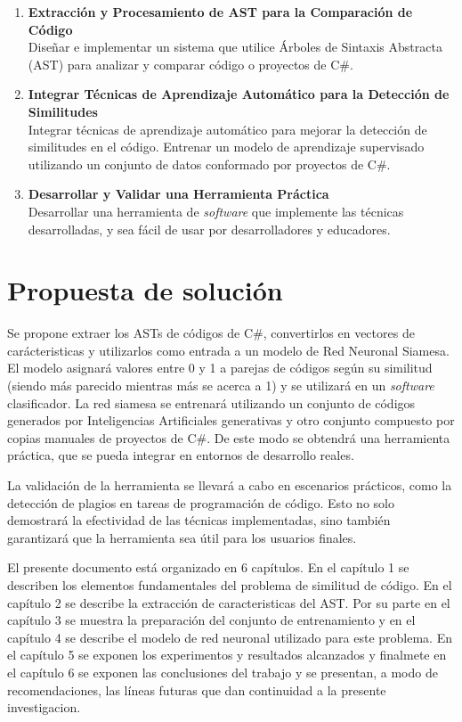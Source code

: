 \renewcommand{\labelenumi}{\Roman{enumi}.}
\begin{enumerate}
	\item {\bf Extracción y Procesamiento de AST para la Comparación de Código}\\
Diseñar e implementar un sistema que utilice Árboles de Sintaxis Abstracta (AST) para analizar y comparar código o proyectos de C\#.   
	
	\item {\bf Integrar Técnicas de Aprendizaje Automático para la Detección de Similitudes} \\
Integrar técnicas de aprendizaje automático para mejorar la detección de similitudes en el código. Entrenar un modelo de aprendizaje supervisado utilizando un conjunto de datos conformado por proyectos de C\#. 

	\item {\bf Desarrollar y Validar una Herramienta Práctica} \\
Desarrollar una herramienta de \textit{software} que implemente las técnicas desarrolladas, y sea f\'acil de usar por desarrolladores y educadores. 
\end{enumerate}

\section*{Propuesta de solución}


Se propone extraer los ASTs de códigos de C\#, convertirlos en vectores de carácteristicas y utilizarlos como entrada a un modelo de Red Neuronal Siamesa. El modelo asignará valores entre 0 y 1 a parejas de códigos según su similitud (siendo más parecido mientras más se acerca a 1) y se utilizará en un \textit{software} clasificador. La red siamesa se entrenará utilizando un conjunto de códigos generados por Inteligencias Artificiales generativas y otro conjunto compuesto por copias manuales de proyectos de C\#. De este modo se obtendrá una herramienta práctica, que se pueda integrar en entornos de desarrollo reales. 

La validación de la herramienta se llevará a cabo en escenarios prácticos, como la detección de plagios en tareas de programación de código. Esto no solo demostrará la efectividad de las técnicas implementadas, sino también garantizará que la herramienta sea útil para los usuarios finales.


El presente documento está organizado en 6 capítulos. En el capítulo 1 se describen los elementos fundamentales del problema de similitud de código. En el capítulo 2 se describe la extracción de caracteristicas del AST. Por su parte en el capítulo 3 se muestra la preparación del conjunto de entrenamiento y en el capítulo 4 se describe el modelo de red neuronal utilizado para este problema. En el capítulo 5 se exponen los experimentos y resultados alcanzados y finalmete en el capítulo 6 se exponen las conclusiones del trabajo y se presentan, a modo de recomendaciones, las líneas futuras que dan continuidad a la presente investigacion.